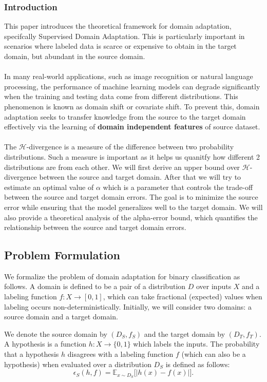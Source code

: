 \documentclass{article}
\begin{document}
\subsubsection{Introduction}
This paper\cite{Ben-David2010} introduces the theoretical framework for domain adaptation, specifcally Supervised Domain Adaptation. This is particularly important in scenarios where labeled data is scarce or expensive to obtain in the target domain, but abundant in the source domain. \\
\\
In many real-world applications, such as image recognition or natural language processing, the performance of machine learning models can degrade significantly when the training and testing data come from different distributions. This phenomenon is known as domain shift or covariate shift. To prevent this, domain adaptation seeks to transfer knowledge from the source to the target domain effectively via the learning of \textbf{domain independent features} of source dataset.
\\
\\
The $\mathcal{H}$-divergence is a measure of the difference between two probability distributions. Such a measure is important as it helps us quanitfy how different 2 distributions are from each other. We will first derive an upper bound over $\mathcal{H}$-divergence between the source and target domain. After that we will try to estimate an optimal value of $\alpha$ which is a parameter that controls the trade-off between the source and target domain errors. The goal is to minimize the source error while ensuring that the model generalizes well to the target domain. We will also provide a theoretical analysis of the alpha-error bound, which quantifies the relationship between the source and target domain errors.

\subsection{Problem Formulation}
We formalize the problem of domain adaptation for binary classification as follows. A domain is defined to be a pair of a distribution $D$ over inputs $X$ and a labeling function $f : X \to [0,1]$, which can take fractional (expected) values when labeling occurs non-deterministically. Initially, we will consider two domains: a source domain and a target domain. 

We denote the source domain by $(D_S, f_S)$ and the target domain by $(D_T, f_T)$. A hypothesis is a function $h : X \to \{0,1\}$ which labels the inputs. The probability that a hypothesis $h$ disagrees with a labeling function $f$ (which can also be a hypothesis) when evaluated over a distribution $D_S$ is defined as follows:
\[
\epsilon_S(h, f) = \mathbb{E}_{x \sim D_S} \big[ |h(x) - f(x)| \big].
\]
\end{document}

